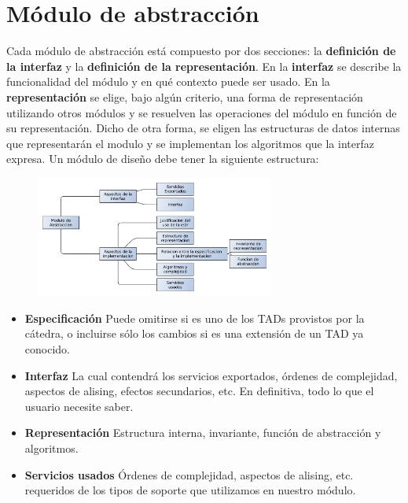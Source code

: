 \documentclass[10pt, a4paper]{report}
\begin{document}
\newpage

\section{M\'odulo de abstracci\'on}

Cada m\'odulo de abstracci\'on est\'a compuesto por dos secciones: la \textbf{definici\'on de la interfaz} y la \textbf{definici\'on de la representaci\'on}. En la \textbf{interfaz} se describe la funcionalidad del m\'odulo y en qu\'e contexto puede ser usado. En la \textbf{representaci\'on} se elige, bajo alg\'un criterio, una forma de representaci\'on utilizando otros m\'odulos y se resuelven las operaciones del m\'odulo en funci\'on de su representaci\'on. Dicho de otra forma, se eligen las estructuras de datos internas que representar\'an el modulo y se implementan los algoritmos que la interfaz expresa. Un m\'odulo de dise\~no debe tener la siguiente estructura:

\begin{figure}
 \centering
 \includegraphics[width=0.7\textwidth]{ModuloDeDisenio.pdf}
\end{figure}

\begin{itemize}
 \item \textbf{Especificaci\'on} Puede omitirse si es uno de los TADs provistos por la c\'atedra, o incluirse s\'olo los cambios si es una extensi\'on de un TAD ya conocido.
 \item \textbf{Interfaz} La cual contendr\'a los servicios exportados, \'ordenes de complejidad, aspectos de alising, efectos secundarios, etc. En definitiva, todo lo que el usuario necesite saber.
 \item \textbf{Representaci\'on} Estructura interna, invariante, funci\'on de abstracci\'on y algoritmos.
 \item \textbf{Servicios usados} \'Ordenes de complejidad, aspectos de alising, etc. requeridos de los tipos de soporte que utilizamos en nuestro m\'odulo.
\end{itemize}
\end{document}
